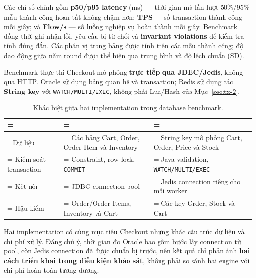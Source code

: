 Các chỉ số chính gồm \textbf{p50/p95 latency} (ms) — thời gian mà lần lượt 50\%/95\% mẫu thành công hoàn tất không chậm hơn; \textbf{TPS} — số transaction thành công mỗi giây; và \textbf{Flow/s} — số luồng nghiệp vụ hoàn thành mỗi giây. Benchmark đồng thời ghi nhận lỗi, yêu cầu bị từ chối và \textbf{invariant violations} để kiểm tra tính đúng đắn. Các phân vị trong bảng được tính trên các mẫu thành công; độ dao động giữa năm round được thể hiện qua trung bình và độ lệch chuẩn (SD).

\label{sec:tx-3-2}
Benchmark thực thi Checkout mô phỏng \textbf{trực tiếp qua JDBC/Jedis}, không qua HTTP. Oracle sử dụng bảng quan hệ và transaction; Redis sử dụng các \textbf{String key} với \texttt{WATCH/\allowbreak{}MULTI/\allowbreak{}EXEC}, không phải Lua/Hash của Mục~\ref{sec:tx-2}.

\begin{table}[H]
\centering
\caption{Khác biệt giữa hai implementation trong database benchmark.}\label{tab:tx-11}
\reporttablesetup
\footnotesize
\begin{tabularx}{\linewidth}{|>{\hsize\linewidth=\hsize}L|>{\hsize\linewidth=\hsize}L|>{\hsize\linewidth=\hsize}L|}
\hline
{}
 &  &  \\ \hline
Dữ liệu & Các bảng Cart, Order, Order Item và Inventory & String key mô phỏng Cart, Order, Price và Stock \\ \hline
Kiểm soát transaction & Constraint, row lock, \texttt{COMMIT} & Java validation, \texttt{WATCH/\allowbreak{}MULTI/\allowbreak{}EXEC} \\ \hline
Kết nối & JDBC connection pool & Jedis connection riêng cho mỗi worker \\ \hline
Hậu kiểm & Order/Order Items, Inventory và Cart & Các key Order, Stock và Cart \\ \hline
\end{tabularx}
\end{table}
Hai implementation có cùng mục tiêu Checkout nhưng khác cấu trúc dữ liệu và chi phí xử lý. Đáng chú ý, thời gian đo Oracle bao gồm bước lấy connection từ pool, còn Jedis connection đã được chuẩn bị trước, nên kết quả chỉ phản ánh \textbf{hai cách triển khai trong điều kiện khảo sát}, không phải so sánh hai engine với chi phí hoàn toàn tương đương.

